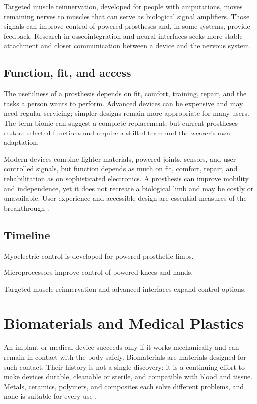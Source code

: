 \documentclass[12pt,oneside]{book}
\begin{document}
Targeted muscle reinnervation, developed for people with amputations, moves
remaining nerves to muscles that can serve as biological signal amplifiers.
Those signals can improve control of powered prostheses and, in some systems,
provide feedback. Research in osseointegration and neural interfaces seeks
more stable attachment and closer communication between a device and the
nervous system.

\section{Function, fit, and access}
The usefulness of a prosthesis depends on fit, comfort, training, repair, and
the tasks a person wants to perform. Advanced devices can be expensive and
may need regular servicing; simpler designs remain more appropriate for many
users. The term bionic can suggest a complete replacement, but current
prostheses restore selected functions and require a skilled team and the
wearer's own adaptation.

Modern devices combine lighter materials, powered joints, sensors, and
user-controlled signals, but function depends as much on fit, comfort, repair,
and rehabilitation as on sophisticated electronics. A prosthesis can improve
mobility and independence, yet it does not recreate a biological limb and may
be costly or unavailable. User experience and accessible design are essential
measures of the breakthrough
\cite{prostheticsHistory,prostheticHandReview}.

\section*{Timeline}
\begin{description}[leftmargin=2.3cm,style=nextline]
  \item[1960s] Myoelectric control is developed for powered prosthetic limbs.
  \item[1980s onward] Microprocessors improve control of powered knees and hands.
  \item[2000s onward] Targeted muscle reinnervation and advanced interfaces expand control options.
\end{description}
\chapter[Biomaterials and Medical Plastics]{Biomaterials and Medical Plastics}

An implant or medical device succeeds only if it works mechanically and can
remain in contact with the body safely. Biomaterials are materials designed
for such contact. Their history is not a single discovery: it is a continuing
effort to make devices durable, cleanable or sterile, and compatible with
blood and tissue. Metals, ceramics, polymers, and composites each solve
different problems, and none is suitable for every use \cite{marinBiomaterialsReview}.
\end{document}
